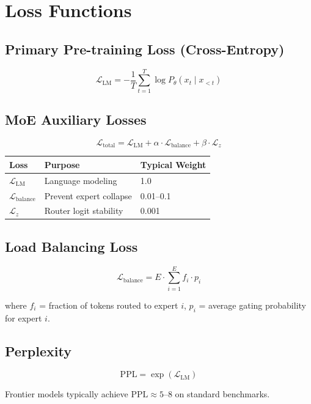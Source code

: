 \documentclass[11pt,a4paper]{article}
\begin{document}
\section{Loss Functions}

\subsection{Primary Pre-training Loss (Cross-Entropy)}

$$\mathcal{L}_{\text{LM}} = -\frac{1}{T}\sum_{t=1}^{T} \log P_\theta(x_t \mid x_{<t})$$

\subsection{MoE Auxiliary Losses}

$$\mathcal{L}_{\text{total}} = \mathcal{L}_{\text{LM}} + \alpha \cdot \mathcal{L}_{\text{balance}} + \beta \cdot \mathcal{L}_z$$

\begin{center}
\begin{tabular}{lll}
\toprule
\textbf{Loss} & \textbf{Purpose} & \textbf{Typical Weight} \\
\midrule
$\mathcal{L}_{\text{LM}}$ & Language modeling & 1.0 \\
$\mathcal{L}_{\text{balance}}$ & Prevent expert collapse & 0.01--0.1 \\
$\mathcal{L}_z$ & Router logit stability & 0.001 \\
\bottomrule
\end{tabular}
\end{center}

\subsection{Load Balancing Loss}

$$\mathcal{L}_{\text{balance}} = E \cdot \sum_{i=1}^{E} f_i \cdot p_i$$

where $f_i$ = fraction of tokens routed to expert $i$, $p_i$ = average gating probability for expert $i$.

\subsection{Perplexity}

$$\text{PPL} = \exp(\mathcal{L}_{\text{LM}})$$

Frontier models typically achieve $\text{PPL} \approx 5\text{--}8$ on standard benchmarks.
\end{document}

